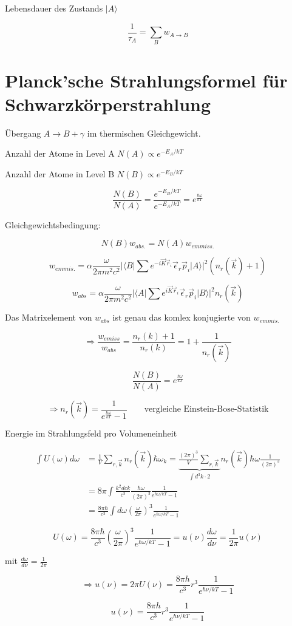 Lebensdauer des Zustands \(|A\rangle \)

\[\boxed{\frac{1}{\tau_A} = \sum_B w_{A\to B}}\]


\section{Planck'sche Strahlungsformel für Schwarzkörperstrahlung}


Übergang \(A \rightarrow  B+\gamma\) im thermischen Gleichgewicht. 

Anzahl der Atome in Level A \(N(A)\propto e^{-E_A/kT}\)

Anzahl der Atome in Level B \(N(B)\propto e^{-E_B/kT}\)

\[\frac{N(B)}{N(A)} = \frac{e^{-E_B/kT}}{e^{-E_A/kT}} = e^{\frac{\hbar \omega}{kT}}\]

Gleichgewichtsbedingung:

\[N(B) w_{abs.} = N(A)w_{emmiss.}\]


\[w_{emmis.} = \alpha \frac{\omega}{2\pi m^2c^2}|\langle B|\sum e^{-i\vec K\vec r_i}\vec \epsilon_r\vec p_i|A\rangle |^2(n_r(\vec k)+1)\]

\[w_{abs} = \alpha \frac{\omega}{2\pi m^2c^2}|\langle A|\sum e^{i\vec K\vec r_i}\vec \epsilon_r\vec p_i|B\rangle |^2n_r(\vec k)\]

Das Matrixelement von \(w_{abs}\) ist genau das komlex konjugierte von \(w_{emmis.}\)

\[\Rightarrow \frac{w_{emiss}}{w_{abs}} = \frac{n_r(k)+1}{n_r(k)} = 1+\frac{1}{n_r(\vec k)}\]

\[\frac{N(B)}{N(A)} = e^{\frac{\hbar\omega}{kT}}\]



\[\Rightarrow \boxed{n_r(\vec k) = \frac{1}{e^{\frac{\hbar\omega}{kT}}-1} }\qquad \text{vergleiche Einstein-Bose-Statistik} \]


Energie im Strahlungsfeld pro Volumeneinheit

\begin{align}
\int U(\omega)d\omega &= \frac{1}{V} \sum_{r,\vec k}n_r(\vec k) \hbar \omega_k = \underbrace{\frac{(2\pi)^3}{V}\sum_{r,\vec k}}_{\int d^3 k\cdot 2}  n_r(\vec k)\hbar\omega \frac{1}{(2\pi)^3}\\
&=8\pi \int \frac{k^2 dck}{c^3}\frac{\hbar\omega}{(2\pi)^3}\frac{1}{e^{\hbar\omega/kT}-1}\\
&= \frac{8\pi\hbar}{c^3}\int d\omega (\frac{\omega}{2\pi})^3 \frac{1}{e^{\hbar\omega/kT}-1}
\end{align}


\[U(\omega) = \frac{8\pi\hbar}{c^3} (\frac{\omega}{2\pi})^3 \frac{1}{e^{\hbar\omega/kT}-1} = u(\nu) \frac{d\omega}{d\nu} = \frac{1}{2\pi}u(\nu) \]

mit \(\frac{d\omega}{d\nu} = \frac{1}{2\pi}\)

\[\Rightarrow u(\nu) = 2\pi U(\nu) = \frac{8\pi h}{c^3} r^3 \frac{1}{e^{\hbar\nu/kT}-1} \]

\[\boxed{ u(\nu)= \frac{8\pi h}{c^3} r^3 \frac{1}{e^{\hbar\nu/kT}-1}  }  \]





